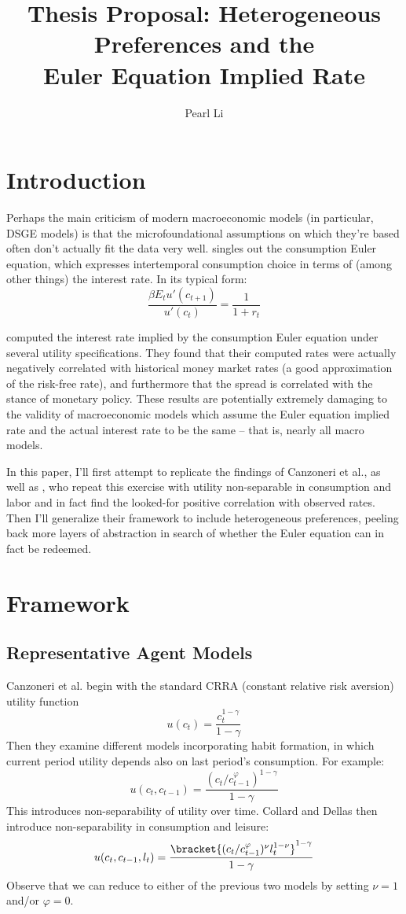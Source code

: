 \documentclass{hw}
\begin{document}
\title{Thesis Proposal: Heterogeneous Preferences and the \\ Euler Equation Implied Rate}
\author{Pearl Li}
\maketitle

\section{Introduction}
Perhaps the main criticism of modern macroeconomic models (in particular, DSGE models) is that the microfoundational assumptions on which they're based often don't actually fit the data very well. \cite{smith14} singles out the consumption Euler equation, which expresses intertemporal consumption choice in terms of (among other things) the interest rate. In its typical form: $$\frac{\beta E_t u'(c_{t+1})}{u'(c_t)} = \frac{1}{1+r_t}$$

\cite{canzoneri07} computed the interest rate implied by the consumption Euler equation under several utility specifications. They found that their computed rates were actually negatively correlated with historical money market rates (a good approximation of the risk-free rate), and furthermore that the spread is correlated with the stance of monetary policy. These results are potentially extremely damaging to the validity of macroeconomic models which assume the Euler equation implied rate and the actual interest rate to be the same -- that is, nearly all macro models.

In this paper, I'll first attempt to replicate the findings of Canzoneri et al., as well as \cite{collard11}, who repeat this exercise with utility non-separable in consumption and labor and in fact find the looked-for positive correlation with observed rates. Then I'll generalize their framework to include heterogeneous preferences, peeling back more layers of abstraction in search of whether the Euler equation can in fact be redeemed.

\section{Framework}
\subsection{Representative Agent Models}
Canzoneri et al. begin with the standard CRRA (constant relative risk aversion) utility function $$u(c_t) = \frac{c_t^{1-\gamma}}{1-\gamma}$$
Then they examine different models incorporating habit formation, in which current period utility depends also on last period's consumption. For example: $$u(c_t, c_{t-1}) = \frac{(c_t/c_{t-1}^\varphi)^{1-\gamma}}{1-\gamma}$$
This introduces non-separability of utility over time. Collard and Dellas then introduce non-separability in consumption and leisure: $$u(c_t, c_{t-1}, l_t) = \frac{\bracket{(c_t/c_{t-1}^\varphi)^\nu l_t^{1-\nu}}^{1-\gamma}}{1-\gamma}$$
Observe that we can reduce to either of the previous two models by setting $\nu = 1$ and/or $\varphi = 0$.
\end{document}
